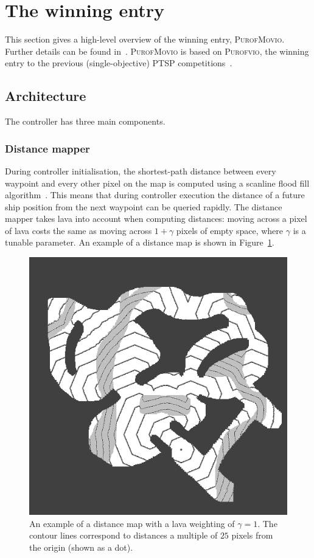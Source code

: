 \documentclass[conference]{IEEEtran}
\begin{document}
\section{The winning entry} \label{sec:purofmovio}

This section gives a high-level overview of the winning entry, \textsc{PurofMovio}.
Further details can be found in~\cite{Powley2013_moptsp}.
\textsc{PurofMovio} is based on \textsc{Purofvio}, the winning entry to the previous (single-objective) PTSP competitions~\cite{Powley2012,Perez2013}.

\subsection{Architecture}

The controller has three main components.

\subsubsection{Distance mapper}
During controller initialisation, the shortest-path distance between every waypoint and every other pixel on the map is computed
using a scanline flood fill algorithm~\cite{Lieberman1978}.
This means that during controller execution
the distance of a future ship position from the next waypoint can be queried rapidly.
The distance mapper takes lava into account when computing distances:
moving across a pixel of lava costs the same as moving across $1+\gamma$ pixels of empty space,
where $\gamma$ is a tunable parameter.
An example of a distance map is shown in Figure~\ref{fig:distance-map-weighted}.

\begin{figure}%
\begin{center}
	\includegraphics[width=0.8\columnwidth]{img/distance-map-weighted.png}%
\end{center}
\caption{An example of a distance map with a lava weighting of $\gamma = 1$. The contour lines correspond to distances a multiple of $25$ pixels from the origin (shown as a dot).}%
\label{fig:distance-map-weighted}%
\end{figure}
\end{document}
